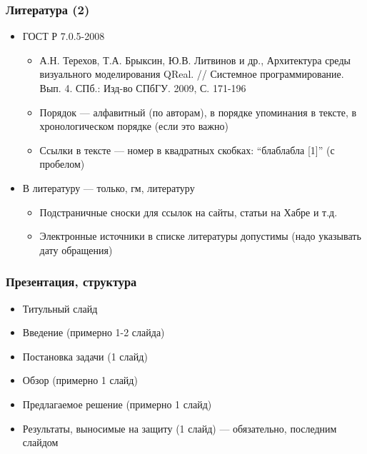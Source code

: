 \documentclass[xetex,mathserif,serif]{beamer}
\begin{document}
    \begin{frame}
        \frametitle{Литература (2)}
        \begin{itemize}
            \item ГОСТ Р 7.0.5-2008
            \begin{itemize}
                \item А.Н. Терехов, Т.А. Брыксин, Ю.В. Литвинов и др., Архитектура среды визуального моделирования QReal. // Системное программирование. Вып. 4. СПб.: Изд-во СПбГУ. 2009, С. 171-196
                \item Порядок --- алфавитный (по авторам), в порядке упоминания в тексте, в хронологическом порядке (если это важно)
                \item Ссылки в тексте --- номер в квадратных скобках: ``блаблабла [1]'' (с пробелом)
            \end{itemize}
            \item В литературу --- только, гм, литературу
            \begin{itemize}
                \item Подстраничные сноски для ссылок на сайты, статьи на Хабре и т.д.
                \item Электронные источники в списке литературы допустимы (надо указывать дату обращения)
            \end{itemize}
        \end{itemize}
    \end{frame}

    \begin{frame}
        \frametitle{Презентация, структура}
        \begin{itemize}
            \item Титульный слайд
            \item Введение (примерно 1-2 слайда)
            \item Постановка задачи (1 слайд)
            \item Обзор (примерно 1 слайд)
            \item Предлагаемое решение (примерно 1 слайд)
            \item Результаты, выносимые на защиту (1 слайд) --- обязательно, последним слайдом
        \end{itemize}
    \end{frame}
\end{document}
